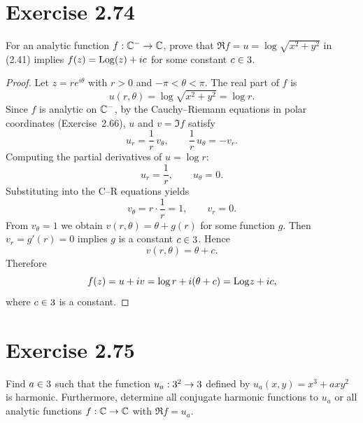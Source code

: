 \documentclass{article}
\begin{document}
\section{Exercise 2.74}

For an analytic function $f : \mathbb{C}^- \to \mathbb{C}$, prove that $\Re f = u =
\log \sqrt{x^2+y^2}$ in (2.41) implies $f(z) = \mathrm{Log}(z) + ic$ for some
constant $c \in 3$.

\begin{proof}
  Let $z = re^{i\theta}$ with $r > 0$ and $-\pi < \theta < \pi$. The real
  part of $f$ is
  \[
    u(r, \theta) = \log\sqrt{x^2 + y^2} = \log r.
  \]
  Since $f$ is analytic on $\mathbb{C}^-$, by the Cauchy--Riemann equations in
  polar coordinates (Exercise~2.66), $u$ and $v = \Im f$ satisfy
  \[
    u_r = \frac{1}{r}\,v_\theta, \qquad \frac{1}{r}\,u_\theta = -v_r.
  \]
  Computing the partial derivatives of $u = \log r$:
  \[
    u_r = \frac{1}{r}, \qquad u_\theta = 0.
  \]
  Substituting into the C--R equations yields
  \[
    v_\theta = r \cdot \frac{1}{r} = 1, \qquad v_r = 0.
  \]
  From $v_\theta = 1$ we obtain $v(r, \theta) = \theta + g(r)$ for some
  function $g$. Then $v_r = g'(r) = 0$ implies $g$ is a constant $c \in
  3$. Hence
  \[
    v(r, \theta) = \theta + c.
  \]
  Therefore
  \[
    f(z) = u + iv = \log r + i(\theta + c) = \mathrm{Log} z + ic,
  \]
  where $c \in 3$ is a constant.
\end{proof}

\section{Exercise 2.75}

Find $a \in 3$ such that the function $u_a : 3^2 \to 3$ defined by
$u_a(x, y) = x^3 + axy^2$ is harmonic. Furthermore, determine all
conjugate harmonic functions to $u_a$ or all analytic functions $f :
\mathbb{C} \to \mathbb{C}$ with $\Re f = u_a$.
\end{document}
